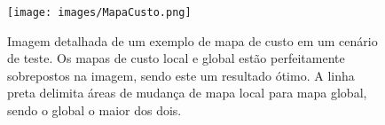 \begin{figure}[H]
\centering
  \texttt{[image: images/MapaCusto.png]} 
\caption{\small{Imagem detalhada de um exemplo de mapa de custo em um cenário de teste. Os mapas de custo local e global estão perfeitamente sobrepostos na imagem, sendo este um resultado ótimo. A linha preta delimita áreas de mudança de mapa local para mapa global, sendo o global o maior dos dois.}}
\label{fig:costmap}
\end{figure} 
